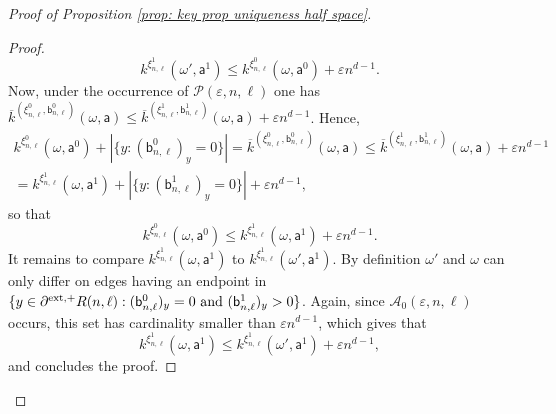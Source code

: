 \documentclass[11pt,a4paper]{article}
\numberwithin{equation}{section}
\theoremstyle{plain}
\theoremstyle{definition}
\begin{document}
\begin{proof}[Proof of Proposition \textup{\ref{prop: key prop uniqueness half space}}]
\begin{proof}
\begin{equation}
    k^{\xi^1_{n,\ell}}(\omega',\mathsf{a}^1)\leq k^{\xi^0_{n,\ell}}(\omega,\mathsf{a}^0)+\varepsilon n^{d-1}.
\end{equation}
Now, under the occurrence of $\mathcal{P}(\varepsilon,n,\ell)$ one has $\overline{k}^{(\xi^0_{n,\ell},\mathsf{b}^0_{n,\ell})}(\omega,\mathsf{a})\leq \overline{k}^{(\xi^1_{n,\ell},\mathsf{b}^1_{n,\ell})}(\omega,\mathsf{a})+\varepsilon n^{d-1}$. Hence,
\begin{multline}
    k^{\xi^0_{n,\ell}}(\omega,\mathsf{a}^0)+|\{y: (\mathsf{b}^0_{n,\ell})_y=0\}|=\overline{k}^{(\xi^0_{n,\ell},\mathsf{b}^0_{n,\ell})}(\omega,\mathsf{a})\leq \overline{k}^{(\xi^1_{n,\ell},\mathsf{b}^1_{n,\ell})}(\omega,\mathsf{a})+\varepsilon n^{d-1}\\=k^{\xi^1_{n,\ell}}(\omega,\mathsf{a}^1)+|\{y: (\mathsf{b}^1_{n,\ell})_y=0\}|+\varepsilon n^{d-1},
\end{multline}
so that
\begin{equation}
    k^{\xi^0_{n,\ell}}(\omega,\mathsf{a}^0)\leq k^{\xi^1_{n,\ell}}(\omega,\mathsf{a}^1)+\varepsilon n^{d-1}.
\end{equation}
It remains to compare $k^{\xi^1_{n,\ell}}(\omega,\mathsf{a}^1)$ to $k^{\xi^1_{n,\ell}}(\omega',\mathsf{a}^1)$. By definition $\omega'$ and $\omega$ can only differ on edges having an endpoint in $\{y\in \partial^{\textup{ext},+}R(n,\ell):(\mathsf{b}^0_{n,\ell})_y=0 \textup{ and }(\mathsf{b}_{n,\ell}^1)_y>0\}$. Again, since $\mathcal{A}_0(\varepsilon,n,\ell)$ occurs, this set has cardinality smaller than $\varepsilon n^{d-1}$, which gives that 
\begin{equation}
    k^{\xi^1_{n,\ell}}(\omega,\mathsf{a}^1)\leq k^{\xi^1_{n,\ell}}(\omega',\mathsf{a}^1)+\varepsilon n^{d-1},
\end{equation}
and concludes the proof.
\end{proof}


\end{proof}
\end{document}
